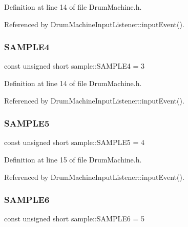 Definition at line 14 of file Drum\+Machine.\+h.



Referenced by Drum\+Machine\+Input\+Listener\+::input\+Event().

\mbox{\label{namespacesample_ac15354120ebb7dccc9ba3f548e996148}} 
\subsubsection{\texorpdfstring{S\+A\+M\+P\+L\+E4}{SAMPLE4}}
{\footnotesize\ttfamily const unsigned short sample\+::\+S\+A\+M\+P\+L\+E4 = 3}



Definition at line 14 of file Drum\+Machine.\+h.



Referenced by Drum\+Machine\+Input\+Listener\+::input\+Event().

\mbox{\label{namespacesample_ae4dc2e0aefa868bda5be2fcdc695ef4e}} 
\subsubsection{\texorpdfstring{S\+A\+M\+P\+L\+E5}{SAMPLE5}}
{\footnotesize\ttfamily const unsigned short sample\+::\+S\+A\+M\+P\+L\+E5 = 4}



Definition at line 15 of file Drum\+Machine.\+h.



Referenced by Drum\+Machine\+Input\+Listener\+::input\+Event().

\mbox{\label{namespacesample_af6cf4e0873f330ffdf8d341aca16d6cc}} 
\subsubsection{\texorpdfstring{S\+A\+M\+P\+L\+E6}{SAMPLE6}}
{\footnotesize\ttfamily const unsigned short sample\+::\+S\+A\+M\+P\+L\+E6 = 5}



